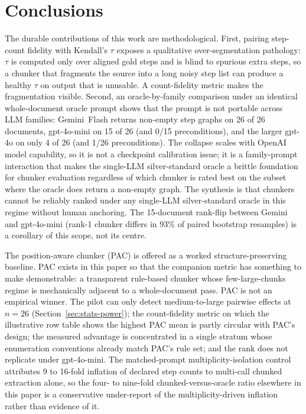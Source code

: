 \documentclass[make,article,submit,oneauthor,pdftex]{Definitions/mdpi}
\begin{document}
\section{Conclusions}

The durable contributions of this work are methodological. First,
pairing step-count fidelity with Kendall's $\tau$ exposes a qualitative
over-segmentation pathology: $\tau$ is computed only over aligned gold
steps and is blind to spurious extra steps, so a chunker that fragments
the source into a long noisy step list can produce a healthy $\tau$ on
output that is unusable. A count-fidelity metric makes the
fragmentation visible. Second, an oracle-by-family comparison under an identical
whole-document oracle prompt shows that the prompt is not portable
across LLM families: Gemini~Flash returns non-empty step graphs on
26 of 26 documents, gpt-4o-mini on 15 of 26 (and 0/15 preconditions),
and the larger gpt-4o on only 4 of 26 (and 1/26 preconditions). The
collapse scales with OpenAI model capability, so it is not a
checkpoint calibration issue; it is a family-prompt interaction
that makes the single-LLM silver-standard oracle a brittle
foundation for chunker evaluation regardless of which chunker is
rated best on the subset where the oracle does return a non-empty
graph. The synthesis is that chunkers cannot be reliably ranked
under any single-LLM silver-standard oracle in this regime without
human anchoring. The 15-document rank-flip between Gemini and
gpt-4o-mini (rank-1 chunker differs in 93\% of paired bootstrap
resamples) is a corollary of this scope, not its centre.

The position-aware chunker (PAC) is offered as a worked
structure-preserving baseline. PAC exists in this paper so that the
companion metric has something to make demonstrable: a transparent
rule-based chunker whose few-large-chunks regime is mechanically
adjacent to a whole-document pass. PAC is not an empirical winner.
The pilot can only detect medium-to-large pairwise effects at
$n=26$ (Section~\ref{sec:stats-power}); the count-fidelity metric
on which the illustrative row table shows the highest PAC mean is
partly circular with PAC's design; the measured advantage is
concentrated in a single stratum whose enumeration conventions
already match PAC's rule set; and the rank does not replicate under
gpt-4o-mini. The matched-prompt multiplicity-isolation control
attributes 9 to 16-fold inflation of declared step counts to
multi-call chunked extraction alone, so the four- to nine-fold
chunked-versus-oracle ratio elsewhere in this paper is a conservative
under-report of the multiplicity-driven inflation rather than
evidence of it.
\end{document}
